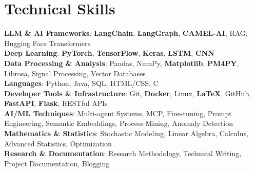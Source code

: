 \documentclass[letterpaper,11pt]{article}
\begin{document}
\section{Technical Skills}
 \begin{itemize}[leftmargin=0.15in, label={}]
    \small{\item{
     \textbf{LLM \& AI Frameworks}{: \textbf{LangChain}, \textbf{LangGraph}, \textbf{CAMEL-AI}, RAG, Hugging Face Transformers} \\
     \textbf{Deep Learning}{: \textbf{PyTorch}, \textbf{TensorFlow}, \textbf{Keras}, \textbf{LSTM}, \textbf{CNN}} \\
     \textbf{Data Processing \& Analysis}{: Pandas, NumPy, \textbf{Matplotlib}, \textbf{PM4PY}, Librosa, Signal Processing, Vector Databases} \\
     \textbf{Languages}{: Python, Java, SQL, HTML/CSS, C} \\
     \textbf{Developer Tools \& Infrastructure}{: Git, \textbf{Docker}, Linux, \textbf{LaTeX}, GitHub, \textbf{FastAPI}, \textbf{Flask}, RESTful APIs} \\
     \textbf{AI/ML Techniques}{: Multi-agent Systems, MCP, Fine-tuning, Prompt Engineering, Semantic Embeddings, Process Mining, Anomaly Detection} \\
     \textbf{Mathematics \& Statistics}{: Stochastic Modeling, Linear Algebra, Calculus, Advanced Statistics, Optimization} \\
     \textbf{Research \& Documentation}{: Research Methodology, Technical Writing, Project Documentation, Blogging}
    }}
 \end{itemize}

\end{document}
